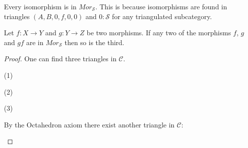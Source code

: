     \begin{remark}
        Every isomorphism is in $Mor_{\mathcal{S}}$. This is because isomorphisms are found in triangles $(A,B,0,f,0,0)$ and $0 : \mathcal{S}$ for any triangulated subcategory.
    \end{remark}

    \begin{lemma}
        Let $f : X \rightarrow Y$ and $g : Y \rightarrow Z$ be two morphisms. If any two of the morphisms $f$, $g$ and $gf$ are in $Mor_{\mathcal{S}}$ then so is the third.
    \end{lemma}

    \begin{proof}
        One can find three triangles in $\mathcal{C}$.
        \begin{center}
            (1)
            (2)
            (3)
        \end{center}
        By the Octahedron axiom there exist another triangle in $\mathcal{C}$:
        \begin{center}
        \end{center}

\end{proof}

